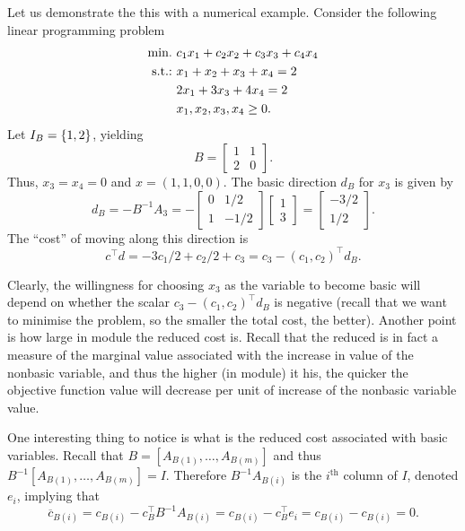 Let us demonstrate the this with a numerical example. Consider the following linear programming problem
%
\begin{align*}
	\mathop{\text{min.~}} & c_1x_1 + c_2x_2 + c_3x_3 + c_4x_4 \\	
	\mathop{\text{s.t.:~}} & x_1 + x_2 + x_3 + x_4 = 2 \\
	& 2x_1 + 3x_3 + 4x_4 = 2 \\
	& x_1, x_2 ,x_3, x_4 \geq 0.  
\end{align*}  
%
Let $I_B = \left\{ 1,2 \right \}$, yielding
% 
\begin{equation*}
	B = \begin{bmatrix}
    		1 & 1 \\
    		2 & 0
    	\end{bmatrix}.
\end{equation*} 
%
Thus, $x_3= x_4 =0$ and $x = (1,1,0,0)$. The basic direction $d_B$ for $x_3$ is given by
%
\begin{equation*}
    d_B = -B^{-1}A_3 = -\begin{bmatrix}
    	0 & 1/2 \\
    	1 & -1/2
    \end{bmatrix} \begin{bmatrix}
    	1 \\ 3
    \end{bmatrix} = \begin{bmatrix}
    	-3/2 \\ 1/2
    \end{bmatrix}.
\end{equation*}
%
The ``cost'' of moving along this direction is 
%
\begin{equation*}
	c^\top d = -3c_1/2 + c_2/2 +c_3 = c_3 - (c_1, c_2)^\top d_B.
\end{equation*}

Clearly, the willingness for choosing $x_3$ as the variable to become basic will depend on whether the scalar $c_3 - (c_1, c_2)^\top d_B$ is negative (recall that we want to minimise the problem, so the smaller the total cost, the better). Another point is how large in module the reduced cost is. Recall that the reduced is in fact a measure of the marginal value associated with the increase in value of the nonbasic variable, and thus the higher (in module) it his, the quicker the objective function value will decrease per unit of increase of the nonbasic variable value.

One interesting thing to notice is what is the reduced cost associated with basic variables. Recall that $B = [A_{B(1)}, \dots, A_{B(m)}]$ and thus $B^{-1}[A_{B(1)}, \dots, A_{B(m)}] = I$. Therefore $B^{-1}A_{B(i)}$ is the $i^\text{th}$ column of $I$, denoted $e_i$, implying that
%
\begin{equation*}
	\overline{c}_{B(i)} = c_{B(i)} - c^\top_B B^{-1} A_{B(i)} = c_{B(i)} - c_B^\top e_i = c_{B(i)} - c_{B(i)} = 0.	
\end{equation*}


